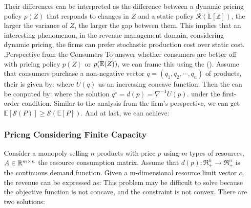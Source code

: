 \documentclass[10pt]{report}
\begin{document}
Their differences can be interpreted as the difference between a dynamic pricing policy $p(Z)$ that responds to changes in $Z$ and a static policy $\mathcal{R}(\mathbb{E}[\mathbb{Z}])$,
the larger the variance of $Z$, the larger the gap between them. This implies that an interesting phenomenon, in the revenue management domain, considering dynamic pricing, the firms can prefer 
stochastic production cost over static cost.
\sep{Perspective from the Consumers}
To answer whether consumers are better off with pricing policy $p(Z)$ or $p(\mathbb{E}(Z))$,
we can frame this using the  (\cite{chen2019welfare}).
Assume that consumers purchase a non-negative vector $q=(q_1,q_2,\cdots,q_n)$ of products, their  is given by:
where $U(q)$ us an increasing concave function. Then the  can be conputed by:
where the solution $q^{\star}=d(p)=\nabla^{-1}U(p)$. under the first-order condition. Similar to the analysis from the firm's perspective, we can get $\mathbb{E}[\mathcal{S}(P)]\geq\mathcal{S}(\mathbb{E}[P])$. And at last, we can achieve:

\subsubsection{Pricng Considering Finite Capacity}
Consider a monopoly selling $n$ products with price $p$ using $m$ types of resources, $A\in \RR^{m\times n}$ the resource consumption matrix. Assume that $d(p):\Re_+^n\to\Re_+^n$ is the continuous demand function. Given a m-dimensional resource limit vector $c$, the revenue can be expressed as:
This problem may be difficult to solve because the objective function is not concave, and the constraint is not convex. There are two solutions:
\end{document}
